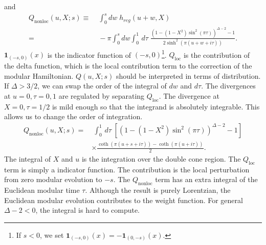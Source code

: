 \documentclass[a4paper,11pt]{article}
\theoremstyle{definition}
\theoremstyle{remark}
\newcommand{\KL}[1]{\textcolor{brown}{#1}}
\begin{document}
and 
\begin{align}
    Q_{\text{nonloc}}(u,X;s) \equiv&\;\int_0^s dw \; h_{reg}(u+w,X) \nonumber\\
    =&\; -\pi\int_0^s dw\int_0^1 \, d\tau  \;\frac{\left(1 - (1-X^2)\sin^2(\pi \tau)\right)^{\Delta-2} -1}{2\sinh^2(\pi (u+w+i\tau))}.
\end{align}
$\textbf{1}_{(-s,0)}(x)$ is the indicator function of $(-s,0)$\footnote{If $s < 0$, we set $\textbf{1}_{(-s,0)}(x) = - \textbf{1}_{(0,-s)}(x)$.}. $Q_{\text{loc}}$ is the contribution of the delta function, which is the local contribution term to the correction of the modular Hamiltonian. $Q(u,X;s)$ should be interpreted in terms of distribution. If $\Delta > 3/2$, we can swap the order of the integral of $dw$ and $d\tau$. The divergences at $u = 0, \tau = 0 , 1$ are regulated by separating $Q_{\text{loc}}$. The divergence at $X=0, \tau = 1/2$ is mild enough so that the integrand is absolutely integrable. This allows us to change the order of integration. 
\begin{align}
    Q_{\text{nonloc}}(u,X;s) =&\; \int_0^1 \, d\tau \; \left[\left(1 - (1-X^2)\sin^2(\pi \tau)\right)^{\Delta-2} -1\right] \nonumber\\
    &\times\frac{\coth(\pi(u+s+i\tau)) - \coth(\pi(u+i\tau))}{2}.
\end{align}
The integral of $X$ and $u$ is the integration over the double cone region. The $Q_{\text{loc}}$ term is simply a indicator function. The contribution is the local perturbation from zero modular evolution to $-s$. The $Q_{\text{nonloc}}$ term has an extra integral of the Euclidean modular time $\tau$. Although the result is purely Lorentzian, the Euclidean modular evolution contributes to the weight function. For general $\Delta-2 < 0$, the integral is hard to compute.
\end{document}
